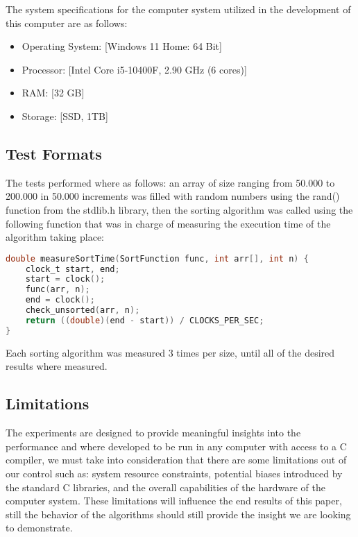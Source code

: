 \documentclass[conference]{IEEEtran}
\begin{document}
The system specifications for the computer system utilized in the development of this computer are as follows:
\begin{itemize}
    \item Operating System: [Windows 11 Home: 64 Bit]
    \item Processor: [Intel Core i5-10400F, 2.90 GHz (6 cores)]
    \item RAM: [32 GB]
    \item Storage: [SSD, 1TB]
\end{itemize}

\subsection{Test Formats}
The tests performed where as follows: an array of size ranging from 50.000 to 200.000 in 50.000 increments was filled with random numbers using the rand() function from the stdlib.h library, then the sorting algorithm was called using the following function that was in charge of measuring the execution time of the algorithm taking place:
\begin{lstlisting}[language=C]
double measureSortTime(SortFunction func, int arr[], int n) {
    clock_t start, end;
    start = clock();
    func(arr, n);
    end = clock();
    check_unsorted(arr, n);
    return ((double)(end - start)) / CLOCKS_PER_SEC;
}
\end{lstlisting}
Each sorting algorithm was measured 3 times per size, until all of the desired results where measured. 
\subsection{Limitations} 
The experiments are designed to provide meaningful insights into the performance and where developed to be run in any computer with access to a C compiler, we must take into consideration that there are some limitations out of our control such as: system resource constraints, potential biases introduced by the standard C libraries, and the overall capabilities of the hardware of the computer system. These limitations will influence the end results of this paper, still the behavior of the algorithms should still provide the insight we are looking to demonstrate.
\end{document}
